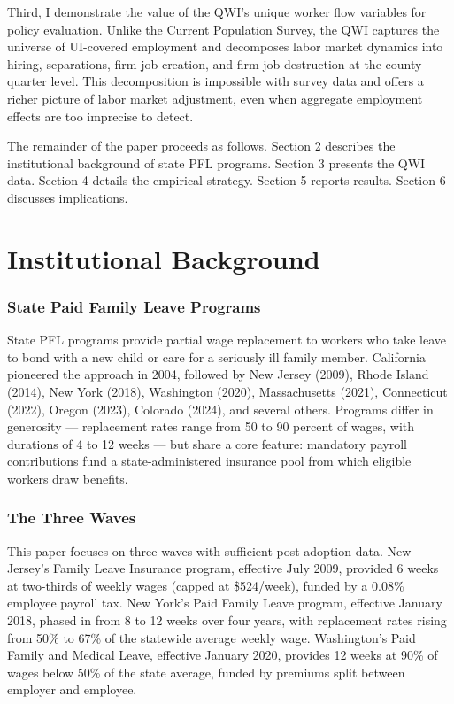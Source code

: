 \documentclass[12pt]{article}
\begin{document}
Third, I demonstrate the value of the QWI's unique worker flow variables for policy evaluation. Unlike the Current Population Survey, the QWI captures the universe of UI-covered employment and decomposes labor market dynamics into hiring, separations, firm job creation, and firm job destruction at the county-quarter level. This decomposition is impossible with survey data and offers a richer picture of labor market adjustment, even when aggregate employment effects are too imprecise to detect.

The remainder of the paper proceeds as follows. Section 2 describes the institutional background of state PFL programs. Section 3 presents the QWI data. Section 4 details the empirical strategy. Section 5 reports results. Section 6 discusses implications.


\section{Institutional Background}

\subsubsection*{State Paid Family Leave Programs} State PFL programs provide partial wage replacement to workers who take leave to bond with a new child or care for a seriously ill family member. California pioneered the approach in 2004, followed by New Jersey (2009), Rhode Island (2014), New York (2018), Washington (2020), Massachusetts (2021), Connecticut (2022), Oregon (2023), Colorado (2024), and several others. Programs differ in generosity --- replacement rates range from 50 to 90 percent of wages, with durations of 4 to 12 weeks --- but share a core feature: mandatory payroll contributions fund a state-administered insurance pool from which eligible workers draw benefits.

\subsubsection*{The Three Waves} This paper focuses on three waves with sufficient post-adoption data. New Jersey's Family Leave Insurance program, effective July 2009, provided 6 weeks at two-thirds of weekly wages (capped at \$524/week), funded by a 0.08\% employee payroll tax. New York's Paid Family Leave program, effective January 2018, phased in from 8 to 12 weeks over four years, with replacement rates rising from 50\% to 67\% of the statewide average weekly wage. Washington's Paid Family and Medical Leave, effective January 2020, provides 12 weeks at 90\% of wages below 50\% of the state average, funded by premiums split between employer and employee.
\end{document}
